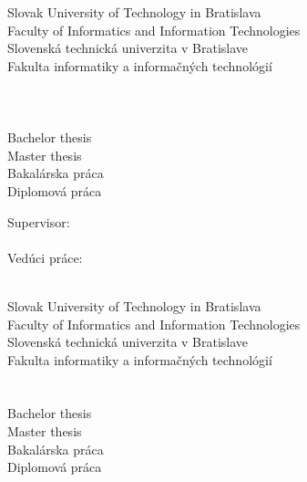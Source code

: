 \begin{center}
\thispagestyle{empty}
{
	{\Large Slovak University of Technology in Bratislava}\textbf{}\\
	{\Large Faculty of Informatics and Information Technologies}\textbf{}\\[\baselineskip]
}
{
	{\Large Slovenská technická univerzita v Bratislave}\textbf{}\\
	{\Large Fakulta informatiky a informačných technológií}\textbf{}\\[\baselineskip]
}
{\large \FIIT}\\
\vspace*{7cm}
{\Large \Author}\textbf{}\\[\baselineskip]
{\Large \Title}\textbf{}\\[\baselineskip]
{
	{
		{\large Bachelor thesis}\\
	}
	{
		{\large Master thesis}\\
	}
}
{
	{
		{\large Bakalárska práca}\\
	}
	{
		{\large Diplomová práca}\\
	}
}

\end{center}
\vspace*{7cm}
{
	Supervisor: \Supervisor \\\\
}
{
	Vedúci práce: \Supervisor \\\\
}
\Month \Year
\newpage
\begin{center}
\thispagestyle{empty}
{
	{\Large Slovak University of Technology in Bratislava}\textbf{}\\
	{\Large Faculty of Informatics and Information Technologies}\textbf{}\\[\baselineskip]
}
{
	{\Large Slovenská technická univerzita v Bratislave}\textbf{}\\
	{\Large Fakulta informatiky a informačných technológií}\textbf{}\\[\baselineskip]
}
\vspace*{6.5cm}
{\Large \Author}\textbf{}\\[\baselineskip]
{\Large \Title}\textbf{}\\[\baselineskip]
{
	{
		{\large Bachelor thesis}\\
	}
	{
		{\large Master thesis}\\
	}
}
{
	{
		{\large Bakalárska práca}\\
	}
	{
		{\large Diplomová práca}\\
	}
}
\end{center}
